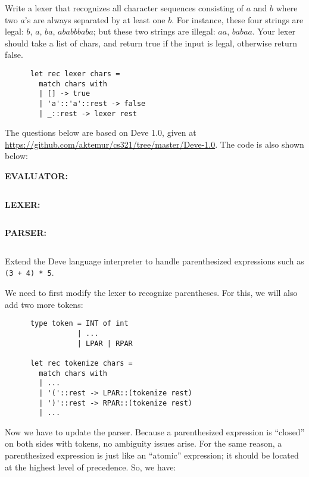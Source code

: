 \documentclass[addpoints]{exam}
\begin{document}
\begin{questions}
  
  \question
  Write a lexer that recognizes all character sequences
  consisting of 
  $a$ and $b$ where two $a$'s are always separated by at least one $b$.
  For instance, these four strings are legal: $b$, $a$, $ba$, $ababbbaba$;
  but these two strings are illegal: $aa$, $babaa$.
  Your lexer should take a list of chars, and return
  true if the input is legal, otherwise return false.

  \begin{solutionbox}{3.5cm}
    \begin{verbatim}
      let rec lexer chars =
        match chars with
        | [] -> true
        | 'a'::'a'::rest -> false
        | _::rest -> lexer rest      
    \end{verbatim}    
  \end{solutionbox}


  \begin{framed}
    The questions below are based on Deve 1.0, given at
    \url{https://github.com/aktemur/cs321/tree/master/Deve-1.0}.
    The code is also shown below:
  \end{framed}

  \textbf{EVALUATOR:}\\
  \inputminted{ocaml}{../../Deve-1.0/deve.ml}

  \textbf{LEXER:}\\
  \inputminted{ocaml}{../../Deve-1.0/lexer.ml}

  \textbf{PARSER:}\\
  \inputminted{ocaml}{../../Deve-1.0/parser.ml}

  
  
  \question
  Extend the Deve language interpreter to handle parenthesized expressions
  such as \texttt{(3 + 4) * 5}.

  \begin{solution}
    We need to first modify the lexer to recognize parentheses.
    For this, we will also add two more tokens:
    
    \begin{verbatim}
      type token = INT of int
                 | ...
                 | LPAR | RPAR

      let rec tokenize chars =
        match chars with
        | ...
        | '('::rest -> LPAR::(tokenize rest)
        | ')'::rest -> RPAR::(tokenize rest)
        | ...
    \end{verbatim}

    Now we have to update the parser.
    Because a parenthesized expression is
    ``closed'' on both sides with tokens,
    no ambiguity issues arise. For the same reason,
    a parenthesized expression is just like an ``atomic''
    expression; it should be located at the highest level of precedence.
    So, we have:


\end{solution}
\end{questions}
\end{document}
